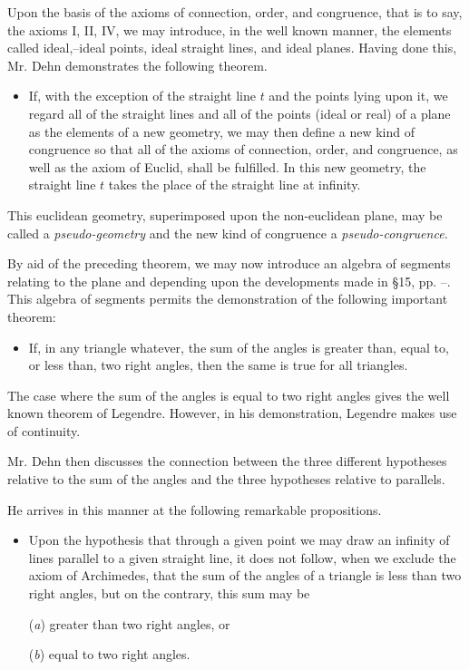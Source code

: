 \documentclass[11pt,oneside]{book}
\begin{document}
Upon the basis of the axioms of connection, order,
and congruence, that is to say, the axioms I, II, IV,
we may introduce, in the well known manner, the elements
called ideal,--ideal points, ideal straight lines,
and ideal planes.  Having done this, Mr. Dehn demonstrates
the following theorem.

\begin{itemize}
\item[] If, with the exception of the straight line $t$ and
the points lying upon it, we regard all of the
straight lines and all of the points (ideal or
real) of a plane as the elements of a new geometry,
we may then define a new kind of congruence
so that all of the axioms of connection,
order, and congruence, as well as the axiom of
Euclid, shall be fulfilled. In this new geometry,
the straight line $t$ takes the place of the
straight line at infinity.
\end{itemize}

This euclidean geometry, superimposed upon the
non-euclidean plane, may be called a \textit{pseudo-geometry}
and the new kind of congruence a \textit{pseudo-congruence.}

By aid of the preceding theorem, we may now introduce
an algebra of segments relating to the plane
and depending upon the developments made in \S 15,
pp. \pageref{folio46}--\pageref{folio50}. This algebra of segments permits the
demonstration of the following important theorem:

\begin{itemize}
\item[ ]If, in any triangle whatever, the sum of the angles
is greater than, equal to, or less than, two
right angles, then the same is true for all triangles.
\end{itemize}

The case where the sum of the angles is equal to
two right angles gives the well known theorem of
Legendre. However, in his demonstration, Legendre
makes use of continuity.

Mr. Dehn then discusses the connection between
the three different hypotheses relative to the sum of
the angles and the three hypotheses relative to parallels.

He arrives in this manner at the following remarkable
propositions.

\begin{itemize}
\item[ ]Upon the hypothesis that through a given point
we may draw an infinity of lines parallel to a
given straight line, it does not follow, when we
exclude the axiom of Archimedes, that the sum
of the angles of a triangle is less than two right
angles, but on the contrary, this sum may be

(\emph{a}) greater than two right angles, or

(\emph{b}) equal to two right angles.
\end{itemize}
\end{document}
